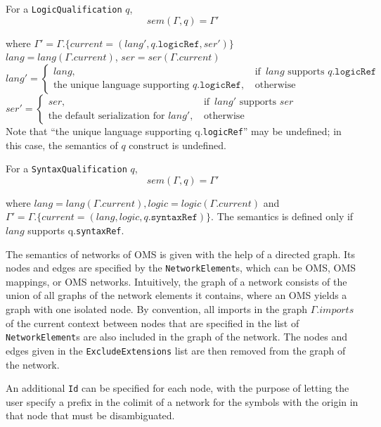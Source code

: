 \documentclass[10pt, a4paper]{isov2}
\newcommand*{\syntax}[1]{\texttt{#1}}
\newcommand{\mBox}[1]{\, \mbox{#1} \,}
\newcommand{\twocase}[3]{
\left\{
\begin{array}{ll}
  #1,&\mBox{if }#2\\
  #3,&\mBox{otherwise}
\end{array}\right.}
\newcommand{\current}{\mathit{current}}
\begin{document}
For a \syntax{LogicQualification} $q$,
 $$sem(\Gamma,q)=\Gamma'$$

 \noindent where 
 $\Gamma' = \Gamma.\{\current = (lang',q.\syntax{logicRef},ser')\}$\\
$lang = lang(\Gamma.\current)$, $ser=ser(\Gamma.\current)$\\
$lang'=\twocase{lang}{lang \textrm{ supports }
   q.\syntax{logicRef}} {\textrm{the unique language supporting
   }q.\syntax{logicRef}}
 $\\
$ser' = \twocase{ser}{lang' \textrm{ supports }
   ser} {\textrm{the default serialization for
   }lang'}$ 
 \\
 Note that ``the unique language supporting q.\syntax{logicRef}'' may
 be undefined; in this case, the semantics of $q$
 construct is undefined.

For a \syntax{SyntaxQualification} $q$,
$$sem(\Gamma,q)=\Gamma'$$

\noindent where $lang = lang(\Gamma.\current), logic = logic(\Gamma.\current)$ and\\
$\Gamma'  = \Gamma.\{\current = (lang, logic, q.\syntax{syntaxRef})\}$. 
The semantics is defined only if $\mathit{lang}$ supports q.\syntax{syntaxRef}.




The semantics of networks of OMS is given with the help of a directed graph. Its nodes
and edges are specified by the \syntax{NetworkElement}s, which can be OMS, OMS mappings, or OMS networks. Intuitively, the graph of a
network consists of the union of all graphs of the network elements it
contains, where an OMS yields a graph with one isolated node. By convention,
all imports in the graph $\Gamma.imports$ of the current context between nodes that are
specified in the list of \syntax{NetworkElement}s are also included in the graph of 
the network. 
The nodes and edges given in the \syntax{ExcludeExtensions} list are then removed from the graph of the network. 

An additional \syntax{Id} can be specified for each node, with the purpose of letting the user specify a 
prefix in the colimit of a network for the symbols with the origin in that node that must be disambiguated.
\end{document}
